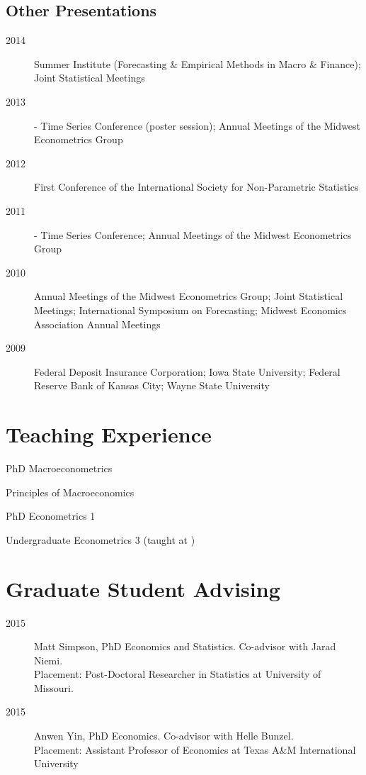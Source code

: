 \documentclass[12pt]{article}%
\newcommand{\allcaps}[1]{\textls{\MakeUppercase{#1}}}
\begin{document}
\subsection*{Other Presentations}
\begin{description}
\item[2014] \allcaps{NBER} Summer Institute (Forecasting \& Empirical Methods in
  Macro \& Finance); Joint Statistical Meetings
\item[2013] \allcaps{NBER}-\allcaps{NSF} Time Series Conference
  (poster session); Annual Meetings of the Midwest Econometrics Group
\item[2012] First Conference of the International Society for
  Non-Parametric Statistics
\item[2011] \allcaps{NBER}-\allcaps{NSF} Time Series Conference;
  Annual Meetings of the Midwest Econometrics Group
\item[2010] Annual Meetings of the Midwest Econometrics Group; Joint
  Statistical Meetings; International Symposium on Forecasting;
  Midwest Economics Association Annual Meetings
\item[2009] Federal Deposit Insurance Corporation; Iowa State
  University; Federal Reserve Bank of Kansas City; Wayne State
  University
\end{description}

\section*{Teaching Experience}

\begin{description}[noitemsep]
\item[2011 -- present] PhD Macroeconometrics
\item[2010 -- present] Principles of Macroeconomics
\item[2009 -- present] PhD Econometrics 1
\item[2009\rlap{:}] Undergraduate Econometrics 3 (taught at \allcaps{UCSD})
\end{description}

\section*{Graduate Student Advising}
\begin{description}
\item[2015] Matt Simpson, PhD Economics and Statistics.  Co-advisor
with Jarad Niemi. \\
Placement: Post-Doctoral Researcher in Statistics at University of Missouri.
\item[2015] Anwen Yin, PhD Economics. Co-advisor with Helle Bunzel. \\
Placement: Assistant Professor of Economics at Texas A\&M
International University
\end{description}
\end{document}
